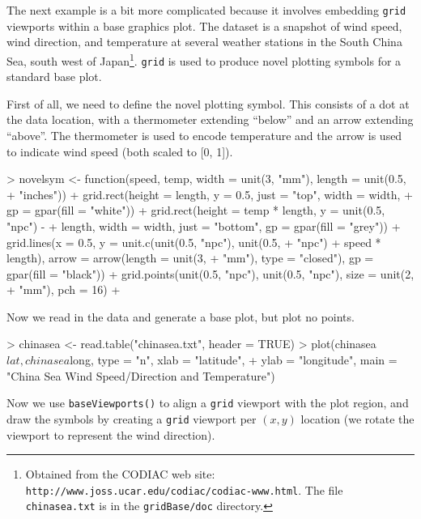 \documentclass[a4paper]{article}
\newcommand{\grid}{{\tt grid}}
\begin{document}
The next example is a bit more complicated because it involves 
embedding \grid{} viewports within a base graphics plot.
The dataset is a snapshot of wind speed, wind direction, and temperature
at several weather stations in the South China Sea, south west of 
Japan\footnote{Obtained from the CODIAC web site:
{\tt http://www.joss.ucar.edu/codiac/codiac-www.html}.  The file
{\tt chinasea.txt} is in the {\tt gridBase/doc} directory.}.
\grid{} is used to produce novel plotting symbols for a standard
base plot.

First of all, we need to define the novel plotting symbol.  This consists
of a dot at the data location, with a thermometer extending ``below''
and an arrow extending ``above''.  The thermometer is used to encode 
temperature 
and the arrow is used to indicate wind speed 
(both scaled to [0, 1]).

\begin{Schunk}
\begin{Sinput}
> novelsym <- function(speed, temp, width = unit(3, "mm"), length = unit(0.5, 
+     "inches")) {
+     grid.rect(height = length, y = 0.5, just = "top", width = width, 
+         gp = gpar(fill = "white"))
+     grid.rect(height = temp * length, y = unit(0.5, "npc") - 
+         length, width = width, just = "bottom", gp = gpar(fill = "grey"))
+     grid.lines(x = 0.5, y = unit.c(unit(0.5, "npc"), unit(0.5, 
+         "npc") + speed * length), arrow = arrow(length = unit(3, 
+         "mm"), type = "closed"), gp = gpar(fill = "black"))
+     grid.points(unit(0.5, "npc"), unit(0.5, "npc"), size = unit(2, 
+         "mm"), pch = 16)
+ }
\end{Sinput}
\end{Schunk}
Now we read in the data and generate a base plot, but plot no points.

\begin{Schunk}
\begin{Sinput}
> chinasea <- read.table("chinasea.txt", header = TRUE)
> plot(chinasea$lat, chinasea$long, type = "n", xlab = "latitude", 
+     ylab = "longitude", main = "China Sea Wind Speed/Direction and Temperature")
\end{Sinput}
\end{Schunk}
Now we use \verb|baseViewports()| to align a \grid{} viewport
with the plot region, and draw the symbols by creating a 
\grid{} viewport per $(x, y)$ location (we rotate the viewport to
represent the wind direction).
\end{document}
